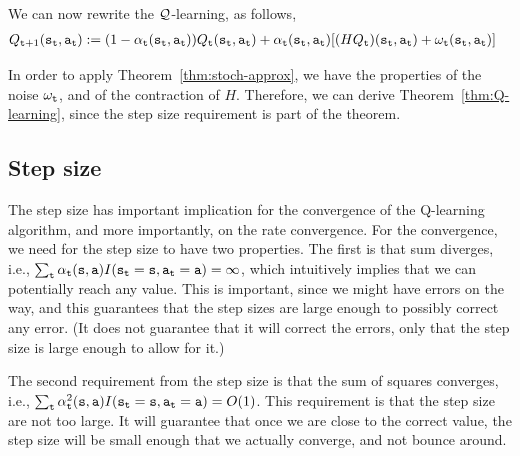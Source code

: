 We can now rewrite the $\mathcal{Q}$-learning, as follows,
\begin{align*}
 Q_{{\tt t}+1}({\tt s}_{\tt t},{\tt a}_{\tt t}) & :=   (1-\alpha_{\tt t}({\tt s}_{\tt t},{\tt a}_{\tt t}) ) Q_{\tt t} ({\tt s}_{\tt t},{\tt a}_{\tt t}) + \alpha_{\tt t}({\tt s}_{\tt t},{\tt a}_{\tt t})
 [(HQ_{\tt t})({\tt s}_{\tt t},{\tt a}_{\tt t})+\omega_{\tt t}({\tt s}_{\tt t},{\tt a}_{\tt t})]
\end{align*}

In order to apply Theorem~\ref{thm:stoch-approx}, we have the
properties of the noise $\omega_{\tt t}$, and of the contraction of
$H$. Therefore, we can derive Theorem~\ref{thm:Q-learning}, since
the step size requirement is part of the theorem.

\subsection{Step size}

The step size has important implication for the convergence of the
Q-learning algorithm, and more importantly, on the rate convergence.
For the convergence, we need for the step size to have two
properties. The first is that sum diverges, i.e., $\sum_{\tt t}
\alpha_{\tt t}({\tt s},{\tt a})
I({\tt s}_{\tt t}={\tt s},{\tt a}_{\tt t}={\tt a})=\infty $, which
intuitively implies that we can potentially reach any value. This is
important, since we might have errors on the way, and this
guarantees that the step sizes are large enough to possibly
correct any error. (It does not guarantee that it will correct the
errors, only that the step size is large enough to allow for it.)

The second requirement from the step size is that the sum of squares
converges, i.e., $\sum_{\tt t} \alpha_{\tt t}^2({\tt s},{\tt a})
I({\tt s}_{\tt t}={\tt s},{\tt a}_{\tt t}={\tt a})=O(1)$. This
requirement is that the step size are not too large. It will
guarantee that once we are close to the correct value, the step size
will be small enough that we actually converge, and not bounce
around.

